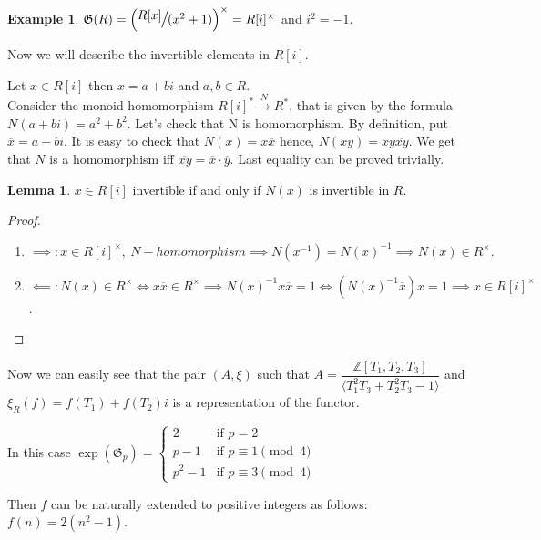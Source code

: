 \documentclass{article}
\theoremstyle{definition}
\newtheorem{example}{Example}
\theoremstyle{definition}
\newtheorem{lemma}{Lemma}
\begin{document}
\begin{example}
    $\mathfrak{G}(R) =  \Large{\left( \sfrac{R[x]}{ (x^2+1)}\right)^{\times}} = 
    R[i]^{\times}$ and $i^2 = -1$.


    Now we will describe the invertible elements in $R[i].$

    Let $x \in R[i]$ then $x = a + bi$ and $a, b \in R$.\\
    Consider the monoid homomorphism $R[i]^*  \xrightarrow{\ N\ } R^*$, that is given by the formula $N(a+bi) = a^2 + b^2.$
    Let's check that N is homomorphism.
    By definition, put $\overline{x} = a - bi$. It is easy to check that $N(x) = x\overline{x}$ hence, $N(xy) = 
    xy\overline{xy}$.
    We get that $N$ is a homomorphism iff $\overline{xy} = \overline{x}\cdot\overline{y}.$
    Last equality can be proved trivially.

    \begin{lemma}
        $x \in R[i]$ invertible if and only if $N(x)$ is invertible in $R$.
    \end{lemma}

    \begin{proof}
    \hspace*{5cm}
    \begin{enumerate}  
         \item $\implies: x \in R[i]^{\times},\ N - homomorphism \implies N(x^{-1}) = N(x)^{-1} \implies N(x)  \in R^{\times}.$
        \item $\impliedby:N(x) \in R^{\times} \iff x\overline{x} \in R^{\times} \implies N(x)^{-1}x\overline{x} = 1 \iff (N(x)^{-1}\overline{x})x = 1\implies x \in R[i]^{\times}$.
    \end{enumerate}
    \end{proof}



Now we can easily see that the pair $(A, \xi)$ such that 
$A = \dfrac{\mathbb{Z}[T_1, T_2, T_3]}{\langle T_1^2T_3+T_2^2T_3-1\rangle}$ and $\xi_R(f)=f(T_1)+f(T_2)i$ is a representation of the functor.

In this case $\operatorname{exp}(\mathfrak{G}_p) = \begin{cases} 
    2 & \text{if } p = 2 \\
    p - 1 & \text{if } p \equiv 1 \pmod{4} \\
    p^2 - 1 & \text{if } p \equiv 3 \pmod{4}
\end{cases}$

Then $f$ can be naturally extended to positive integers as follows: $f(n) = 2(n^2 - 1)$.


\end{example}
\end{document}
